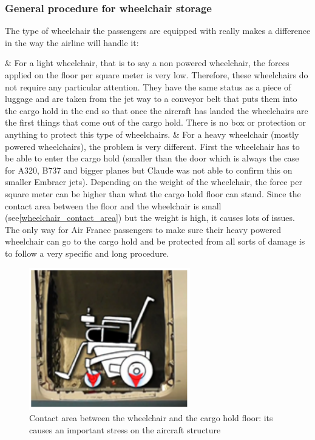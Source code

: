 \subsubsection*{General procedure for wheelchair storage}
The type of wheelchair the passengers are equipped with really makes a difference in the way the airline will handle it:
\begin{easylist}
& For a light wheelchair, that is to say a non powered wheelchair, the forces applied on the floor per square meter is very low. Therefore, these wheelchairs do not require any particular attention. They have the same status as a piece of luggage and are taken from the jet way to a conveyor belt that puts them into the cargo hold in the end so that once the aircraft has landed the wheelchairs are the first things that come out of the cargo hold. There is no box or protection or anything to protect this type of wheelchairs.
& For a heavy wheelchair (mostly powered wheelchairs), the problem is very different. First the wheelchair has to be able to enter the cargo hold (smaller than the door which is always the case for A320, B737 and bigger planes but Claude was not able to confirm this on smaller Embraer jets). Depending on the weight of the wheelchair, the force per square meter can be higher than what the cargo hold floor can stand. Since the contact area between the floor and the wheelchair is small (see\ref{wheelchair_contact_area}) but the weight is high, it causes lots of issues. The only way for Air France passengers to make sure their heavy powered wheelchair can go to the cargo hold and be protected from all sorts of damage is to follow a very specific and long procedure.
\end{easylist}
\begin{figure}[h]
\centering
\includegraphics[width=7cm]{images/wheelchair_contact_area}
\caption{Contact area between the wheelchair and the cargo hold floor: its causes an important stress on the aircraft structure}
\label{fig:wheelchair_contact_area}
\end{figure}

